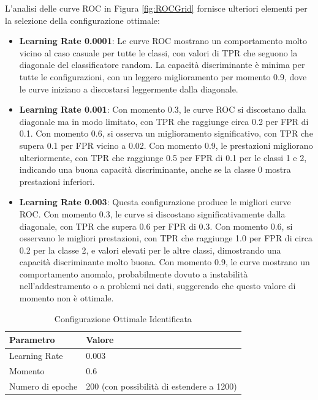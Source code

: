 L'analisi delle curve ROC in Figura \ref{fig:ROCGrid} fornisce ulteriori elementi per la selezione della configurazione ottimale:

\begin{itemize}
\item \textbf{Learning Rate 0.0001}: Le curve ROC mostrano un comportamento molto vicino al caso casuale per tutte le classi, con valori di TPR che seguono la diagonale del classificatore random. La capacità discriminante è minima per tutte le configurazioni, con un leggero miglioramento per momento 0.9, dove le curve iniziano a discostarsi leggermente dalla diagonale.

\item \textbf{Learning Rate 0.001}: Con momento 0.3, le curve ROC si discostano dalla diagonale ma in modo limitato, con TPR che raggiunge circa 0.2 per FPR di 0.1. Con momento 0.6, si osserva un miglioramento significativo, con TPR che supera 0.1 per FPR vicino a 0.02. Con momento 0.9, le prestazioni migliorano ulteriormente, con TPR che raggiunge 0.5 per FPR di 0.1 per le classi 1 e 2, indicando una buona capacità discriminante, anche se la classe 0 mostra prestazioni inferiori.

\item \textbf{Learning Rate 0.003}: Questa configurazione produce le migliori curve ROC. Con momento 0.3, le curve si discostano significativamente dalla diagonale, con TPR che supera 0.6 per FPR di 0.3. Con momento 0.6, si osservano le migliori prestazioni, con TPR che raggiunge 1.0 per FPR di circa 0.2 per la classe 2, e valori elevati per le altre classi, dimostrando una capacità discriminante molto buona. Con momento 0.9, le curve mostrano un comportamento anomalo, probabilmente dovuto a instabilità nell'addestramento o a problemi nei dati, suggerendo che questo valore di momento non è ottimale.
\end{itemize}

\begin{table}[htbp]
\centering
\caption{Configurazione Ottimale Identificata}
\begin{tabular}{|l|l|}
\hline
\textbf{Parametro} & \textbf{Valore} \\
\hline
Learning Rate & 0.003 \\
Momento & 0.6 \\
Numero di epoche & 200 (con possibilità di estendere a 1200) \\
\hline
\end{tabular}
\label{tab:configurazione}
\end{table}


